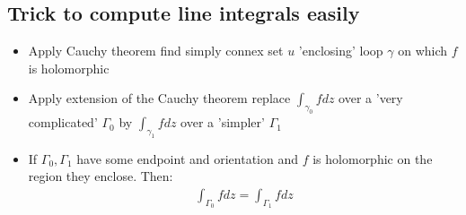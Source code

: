\subsection{Trick to compute line integrals easily}
\begin{itemize}
    \item Apply Cauchy theorem \textrightarrow find simply connex set $u$ 'enclosing' loop $\gamma$ on which $f$ is holomorphic
    \item Apply extension of the Cauchy theorem \textrightarrow replace $\int_{\gamma_0}fdz$ over a 'very complicated' $\Gamma_0$ by $\int_{\gamma_1}fdz$ over a 'simpler' $\Gamma_1$
    \item If $\Gamma_0, \Gamma_1$ have some endpoint and orientation and $f$ is holomorphic on the region they enclose. Then:
		\begin{align*} \int_{\Gamma_0}fdz =  \int_{\Gamma_1}fdz \end{align*}
\end{itemize}

